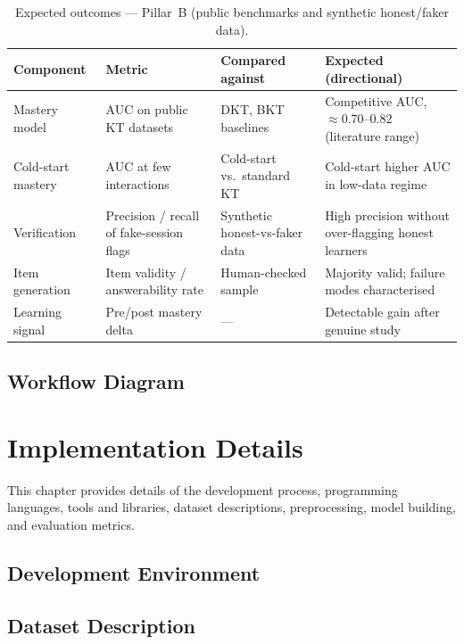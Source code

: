 \documentclass[12pt]{report}
\begin{document}
\begin{table}[htbp]
\centering
\footnotesize
\caption{Expected outcomes --- Pillar~B (public benchmarks and synthetic honest/faker data).}
\label{tab:outcomes-b}
\begin{tabular}{p{2.3cm} p{3.1cm} p{3.0cm} p{4.0cm}}
\toprule
\textbf{Component} & \textbf{Metric} & \textbf{Compared against} & \textbf{Expected (directional)} \\
\midrule
Mastery model & AUC on public KT datasets & DKT, BKT baselines & Competitive AUC, $\approx 0.70$--$0.82$ (literature range) \\
Cold-start mastery & AUC at few interactions & Cold-start vs.\ standard KT & Cold-start higher AUC in low-data regime \\
Verification & Precision / recall of fake-session flags & Synthetic honest-vs-faker data & High precision without over-flagging honest learners \\
Item generation & Item validity / answerability rate & Human-checked sample & Majority valid; failure modes characterised \\
Learning signal & Pre/post mastery delta & --- & Detectable gain after genuine study \\
\bottomrule
\end{tabular}
\end{table}

\section{Workflow Diagram}

\newpage

\chapter{Implementation Details}

This chapter provides details of the development process, programming languages, tools and
libraries, dataset descriptions, preprocessing, model building, and evaluation metrics.

\section{Development Environment}

\section{Dataset Description}
\end{document}
